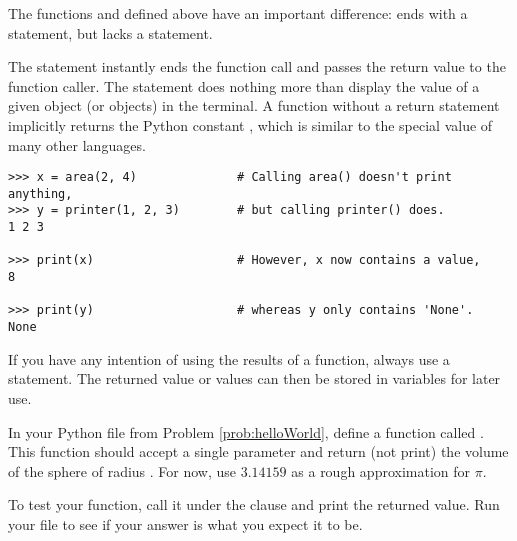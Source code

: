 \begin{info}
The functions  and  defined above have an important difference:  ends with a  statement, but  lacks a  statement.

The  statement instantly ends the function call and passes the return value to the function caller.
The  statement does nothing more than display the value of a given object (or objects) in the terminal. %
A function without a return statement implicitly returns the Python constant , which is similar to the  special value of many other languages.

\begin{lstlisting}
>>> x = area(2, 4)              # Calling area() doesn't print anything,
>>> y = printer(1, 2, 3)        # but calling printer() does.
1 2 3

>>> print(x)                    # However, x now contains a value,
8

>>> print(y)                    # whereas y only contains 'None'.
None
\end{lstlisting}

If you have any intention of using the results of a function, always use a  statement.
The returned value or values can then be stored in variables for later use.
\end{info}

\begin{comment}
\begin{problem}
Python's built-in \li{print} function is extremely useful for formatting output nicely.
Write a function that prints out the alphabet, separated by tabs, with newlines after every 5th letter. %
\end{problem}
\end{comment}

\begin{problem}
In your Python file from Problem \ref{prob:helloWorld}, define a function called .
This function should accept a single parameter  and return (not print) the volume of the sphere of radius .
For now, use $3.14159$ as a rough approximation for $\pi$.

To test your function, call it under the  clause and print the returned value.
Run your file to see if your answer is what you expect it to be.
\end{problem}

